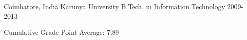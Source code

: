\begin{cventries}
  \cveducation
    {Coimbatore, India}
    {Karunya University}
    {B.Tech. in Information Technology}
    {2009-2013}
    {
      \begin{cvitems}
        \item {Cumulative Grade Point Average: 7.89}
      \end{cvitems}
    }
\end{cventries}
